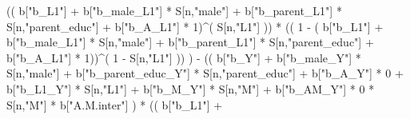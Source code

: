 \documentclass[
]{book}
\newenvironment{Shaded}{\begin{snugshade}}{\end{snugshade}}
\newcommand{\DecValTok}[1]{\textcolor[rgb]{0.00,0.00,0.81}{#1}}
\newcommand{\NormalTok}[1]{#1}
\newcommand{\SpecialCharTok}[1]{\textcolor[rgb]{0.00,0.00,0.00}{#1}}
\newcommand{\StringTok}[1]{\textcolor[rgb]{0.31,0.60,0.02}{#1}}
\begin{document}
\begin{Shaded}
\begin{Highlighting}[]
\NormalTok{                      (( b[}\StringTok{"b\_L1"}\NormalTok{] }\SpecialCharTok{+}
\NormalTok{                           b[}\StringTok{"b\_male\_L1"}\NormalTok{] }\SpecialCharTok{*}\NormalTok{ S[n,}\StringTok{"male"}\NormalTok{] }\SpecialCharTok{+}  
\NormalTok{                           b[}\StringTok{"b\_parent\_L1"}\NormalTok{] }\SpecialCharTok{*}\NormalTok{ S[n,}\StringTok{"parent\_educ"}\NormalTok{] }\SpecialCharTok{+}
\NormalTok{                           b[}\StringTok{"b\_A\_L1"}\NormalTok{] }\SpecialCharTok{*} \DecValTok{1}\NormalTok{)}\SpecialCharTok{\^{}}\NormalTok{( S[n,}\StringTok{"L1"}\NormalTok{] )) }\SpecialCharTok{*}
\NormalTok{                      (( }\DecValTok{1} \SpecialCharTok{{-}}\NormalTok{ ( b[}\StringTok{"b\_L1"}\NormalTok{] }\SpecialCharTok{+}
\NormalTok{                                 b[}\StringTok{"b\_male\_L1"}\NormalTok{] }\SpecialCharTok{*}\NormalTok{ S[n,}\StringTok{"male"}\NormalTok{] }\SpecialCharTok{+}  
\NormalTok{                                 b[}\StringTok{"b\_parent\_L1"}\NormalTok{] }\SpecialCharTok{*}\NormalTok{ S[n,}\StringTok{"parent\_educ"}\NormalTok{] }\SpecialCharTok{+}
\NormalTok{                                 b[}\StringTok{"b\_A\_L1"}\NormalTok{] }\SpecialCharTok{*} \DecValTok{1}\NormalTok{))}\SpecialCharTok{\^{}}\NormalTok{( }\DecValTok{1} \SpecialCharTok{{-}}\NormalTok{ S[n,}\StringTok{"L1"}\NormalTok{] )) ) }\SpecialCharTok{{-}} 
\NormalTok{                      (( b[}\StringTok{"b\_Y"}\NormalTok{] }\SpecialCharTok{+} 
\NormalTok{                          b[}\StringTok{"b\_male\_Y"}\NormalTok{] }\SpecialCharTok{*}\NormalTok{ S[n,}\StringTok{"male"}\NormalTok{] }\SpecialCharTok{+} 
\NormalTok{                          b[}\StringTok{"b\_parent\_educ\_Y"}\NormalTok{] }\SpecialCharTok{*}\NormalTok{ S[n,}\StringTok{"parent\_educ"}\NormalTok{] }\SpecialCharTok{+} 
\NormalTok{                          b[}\StringTok{"b\_A\_Y"}\NormalTok{] }\SpecialCharTok{*} \DecValTok{0} \SpecialCharTok{+} 
\NormalTok{                          b[}\StringTok{"b\_L1\_Y"}\NormalTok{] }\SpecialCharTok{*}\NormalTok{ S[n,}\StringTok{"L1"}\NormalTok{] }\SpecialCharTok{+}
\NormalTok{                          b[}\StringTok{"b\_M\_Y"}\NormalTok{] }\SpecialCharTok{*}\NormalTok{ S[n,}\StringTok{"M"}\NormalTok{] }\SpecialCharTok{+}
\NormalTok{                          b[}\StringTok{"b\_AM\_Y"}\NormalTok{] }\SpecialCharTok{*} \DecValTok{0} \SpecialCharTok{*}\NormalTok{ S[n,}\StringTok{"M"}\NormalTok{] }\SpecialCharTok{*}\NormalTok{ b[}\StringTok{"A.M.inter"}\NormalTok{] ) }\SpecialCharTok{*}
\NormalTok{                      (( b[}\StringTok{"b\_L1"}\NormalTok{] }\SpecialCharTok{+}

\end{Highlighting}
\end{Shaded}
\end{document}
